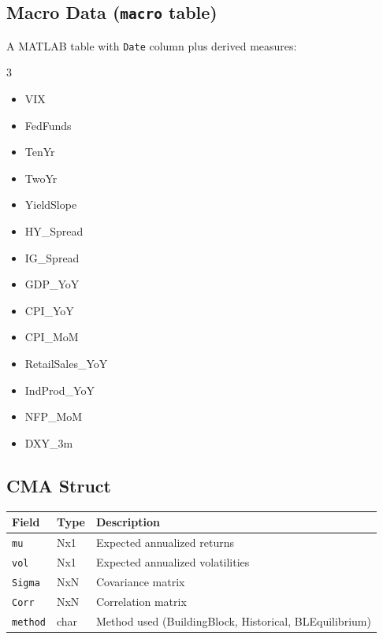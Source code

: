 \documentclass[11pt,a4paper]{article}
\begin{document}
\subsection{Macro Data (\texttt{macro} table)}
A MATLAB table with \texttt{Date} column plus derived measures:
\begin{multicols}{3}
\begin{itemize}[leftmargin=1em,itemsep=0pt]
  \item VIX
  \item FedFunds
  \item TenYr
  \item TwoYr
  \item YieldSlope
  \item HY\_Spread
  \item IG\_Spread
  \item GDP\_YoY
  \item CPI\_YoY
  \item CPI\_MoM
  \item RetailSales\_YoY
  \item IndProd\_YoY
  \item NFP\_MoM
  \item DXY\_3m
\end{itemize}
\end{multicols}

\subsection{CMA Struct}
\begin{center}
\begin{tabularx}{\textwidth}{l l X}
\toprule
\textbf{Field} & \textbf{Type} & \textbf{Description} \\
\midrule
\texttt{mu} & Nx1 & Expected annualized returns \\
\texttt{vol} & Nx1 & Expected annualized volatilities \\
\texttt{Sigma} & NxN & Covariance matrix \\
\texttt{Corr} & NxN & Correlation matrix \\
\texttt{method} & char & Method used (BuildingBlock, Historical, BLEquilibrium) \\
\bottomrule
\end{tabularx}
\end{center}
\end{document}

